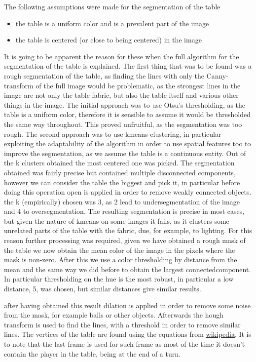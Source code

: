 The following assumptions were made for the segmentation of the table
\begin{itemize}
    \item the table is a uniform color and is a prevalent part of the image
    \item the table is centered (or close to being centered) in the image
\end{itemize}

It is going to be apparent the reason for these when the full algorithm for
the segmentation of the table is explained.
The first thing that was to be found was a rough segmentation of the table,
as finding the lines with only the Canny-transform of the full image would 
be problematic, as the strongest lines in the image are not only the table
fabric, but also the table itself and various other things in the image.
The initial approach was to use Otsu's thresholding, as the table is a uniform
color, therefore it is sensible to assume it would be thresholded the same
way throughout. This proved unfruitful, as the segmentation was too rough.
The second approach was to use kmeans clustering, in particular exploiting the
adaptability of the algorithm in order to use spatial features too to improve
the segmentation, as we assume the table is a continuous entity. Out of the k clusters obtained the most centered one was picked.
The segmentation obtained was fairly precise but contained multiple disconnected
components, however we can consider the table the biggest and pick it, in particular
before doing this operation open is applied in order to remove weakly connected objects.
the k (empirically) chosen was 3, as 2 lead to undersegmentation of the image and 4 to oversegmentation.
The resulting segmentation is precise in most cases, but given the nature of kmeans on some
images it fails, as it clusters some unrelated parts of the table with the fabric, due,
for example, to lighting.
For this reason further processing was required, given we have obtained a rough mask of
the table we now obtain the mean color of the image in the pixels where the mask is non-zero.
After this we use a color thresholding by distance from the mean and the same way we 
did before to obtain the largest connectedcomponent. In particular thresholding on the hue
is the most robust, in particular a low distance, 5, was chosen, but similar distances give similar
results.\par
after having obtained this result dilation is applied in order to remove some noise from the mask,
for example balls or other objects. Afterwards the hough transform is used to find the lines, 
with a threshold in order to remove similar lines.
The vertices of the table are found using the equations from \href{https://en.wikipedia.org/wiki/Line\%E2\%80\%93line\_intersection}{wikipedia}.
It is to note that the last frame is used for such frame as most of the time it doesn't contain the player in the table, being at the end of
a turn.

